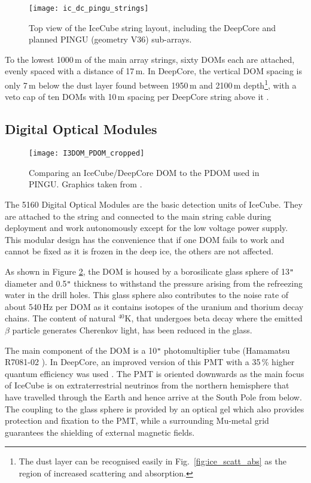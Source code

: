 \begin{figure}[htp]
 \centering
 \texttt{[image: ic\_dc\_pingu\_strings]}
 \caption{Top view of the IceCube string layout, including the DeepCore and 
planned PINGU (geometry V36) sub-arrays.}
 \label{fig:string_layout}
\end{figure}

To the lowest 1000\,m of the main array strings, sixty DOMs each are attached, 
evenly spaced with a distance of 17\,m. In DeepCore, the vertical DOM spacing 
is only 7\,m below the dust layer found between 1950\,m and 2100\,m 
depth\footnote{The dust layer can be recognised easily in 
Fig.~\ref{fig:ice_scatt_abs} as the region of increased scattering and 
absorption.}, with a veto cap of ten DOMs with 10\,m spacing per DeepCore 
string above it \cite{I3Design,DCDesign}.


\subsection{Digital Optical Modules}
\label{sec:ICDOM}

\begin{figure}[htp]
 \centering
 \texttt{[image: I3DOM\_PDOM\_cropped]}
 \caption{Comparing an IceCube/DeepCore DOM to the PDOM used in PINGU. Graphics 
taken from \cite{PDOM_Aachen}.}
 \label{fig:DOM}
\end{figure}

The 5160 Digital Optical Modules are the basic detection units of IceCube. They 
are attached to the string and connected to the main string cable during 
deployment and work autonomously except for the low voltage power supply. This 
modular design has the convenience that if one DOM fails to work and cannot be 
fixed as it is frozen in the deep ice, the others are not affected.

As shown in Figure \ref{fig:DOM}, the DOM is housed by a borosilicate glass 
sphere of 13\verb+"+ diameter and 0.5\verb+"+ thickness to withstand the 
pressure arising from the refreezing water in the drill holes. This glass sphere 
also contributes to the noise rate of about 540\,Hz per DOM as it contains 
isotopes of the uranium and thorium decay chains. The content of natural 
$^{40}\mathrm{K}$, that undergoes beta decay where the emitted $\beta$ particle
generates Cherenkov light, has been reduced in the glass.

The main component of the DOM is a 10\verb+"+ photomultiplier tube (Hamamatsu 
R7081-02 \cite{PMTpaper,PMTdata}). In DeepCore, an improved version of this PMT 
with a 35\,\% higher quantum efficiency was used \cite{DCDesign}. The PMT is 
oriented downwards as the main focus of IceCube is on extraterrestrial neutrinos 
from the northern hemisphere that have travelled through the Earth and hence 
arrive at the South Pole from below. The coupling to the glass sphere is 
provided by an optical gel which also provides protection and fixation to the 
PMT, while a surrounding Mu-metal grid guarantees the shielding of external 
magnetic fields.

